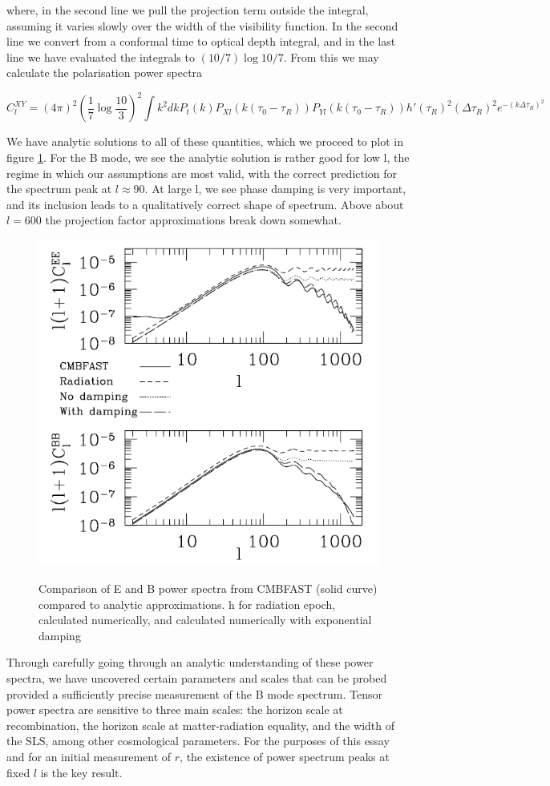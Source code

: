 \documentclass[a4paper,10pt]{article}
\begin{document}
where, in the second line we pull the projection term outside the integral, assuming it varies slowly over the width of the visibility function. In the second line we convert from a conformal time to optical depth integral, and in the last line we have evaluated the integrals to $(10/7)\log{10/7}$. From this we may calculate the polarisation power spectra

\begin{equation}
C_l^{XY} = (4\pi)^2 (\frac{1}{7}\log{\frac{10}{3}})^2 \int k^2dk P_t(k) P_{Xl}(k(\tau_0-\tau_R))P_{Yl}(k(\tau_0-\tau_R))h'(\tau_R)^2(\Delta\tau_R)^2e^{-(k\Delta\tau_R)^2}
\end{equation}

We have analytic solutions to all of these quantities, which we proceed to plot in figure \ref{analytic}. For the B mode, we see the analytic solution is rather good for low l, the regime in which our assumptions are most valid, with the correct prediction for the spectrum peak at $l\approx 90$. At large l, we see phase damping is very important, and its inclusion leads to a qualitatively correct shape of spectrum. Above about $l=600$ the projection factor approximations break down somewhat. \\



\begin{figure}[h]
  \includegraphics[width=0.5\linewidth]{analytic.png}
  \centering
  \label{analytic}
  \caption{Comparison of E and B power spectra from CMBFAST (solid curve) compared to analytic approximations. h for radiation epoch, calculated numerically, and calculated numerically  with exponential damping}
\end{figure}





Through carefully going through an analytic understanding of these power spectra, we have uncovered certain parameters and scales that can be probed provided a sufficiently precise measurement of the B mode spectrum. Tensor power spectra are sensitive to three main scales: the horizon scale at recombination,  the horizon scale at matter-radiation equality, and the width of the SLS, among other cosmological parameters. For the purposes of this essay and for an initial measurement of $r$, the existence of power spectrum peaks at fixed $l$ is the key result.\\
\end{document}
